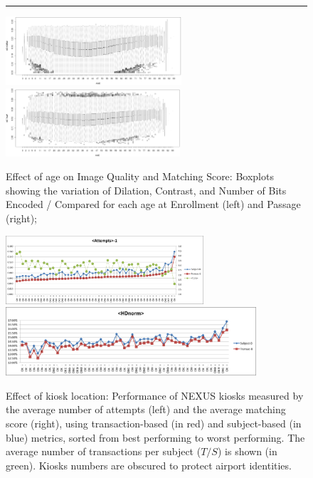 \documentclass{cta-author}%
\begin{document}
{\begin{figure}[!tbh]
\vspace{5pt}
\hrule
\vspace{6pt}


\includegraphics[width=\linewidth,height=1in]{eps/HDNORM.eps}
\includegraphics[width=\linewidth,height=1in]{eps/HDRAW.eps} 
\caption{Effect of age 
on Image Quality and Matching Score: 
 { Boxplots showing  the variation of Dilation, Contrast, and Number of Bits Encoded / Compared for each age
at Enrollment (left) and  Passage (right); }
\label{fHDpassage}}
\end{figure}

}



\begin{figure}[!b]
\centering
\includegraphics[width=0.50\linewidth,height=1in]{eps/image060-hidden.eps}~
\includegraphics[width=0.49\linewidth,height=1in]{eps/image061-hidden.eps} 

\caption{Effect of kiosk location: Performance of NEXUS kiosks measured by the average number of attempts (left) and the average matching score (right), using transaction-based (in red) and subject-based (in blue) metrics, sorted from best performing to worst performing. 
The average number of transactions per subject ($T/S$) is shown (in green).
Kiosks numbers are obscured  to protect airport identities.
}
\label{fKIOSKS}
\end{figure}
\end{document}
